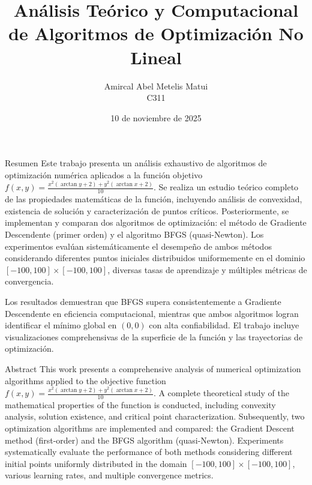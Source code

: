 \documentclass[11pt, a4paper, twocolumn]{beamer}
\author{Amircal Abel Metelis Matui \\ C311}
\title{Análisis Teórico y Computacional de Algoritmos de Optimización No Lineal}
\date{10 de noviembre de 2025}
\institute{
	\inst{1}
		Universidad de La Habana\\
	\inst{2}
		Facultad de Matemática y Computación\\
}
\begin{document}
	
	\begin{frame}
		\maketitle
	\end{frame}

	\begin{frame}{Resumen}
		Este trabajo presenta un análisis exhaustivo de algoritmos de optimización numérica aplicados a la función objetivo $f(x,y) = \frac{x^2 (\arctan y + 2) + y^2 (\arctan x + 2)}{10}$. Se realiza un estudio teórico completo de las propiedades matemáticas de la función, incluyendo análisis de convexidad, existencia de solución y caracterización de puntos críticos. Posteriormente, se implementan y comparan dos algoritmos de optimización: el método de Gradiente Descendente (primer orden) y el algoritmo BFGS (quasi-Newton). Los experimentos evalúan sistemáticamente el desempeño de ambos métodos considerando diferentes puntos iniciales distribuidos uniformemente en el dominio $[-100, 100] \times [-100, 100]$, diversas tasas de aprendizaje y múltiples métricas de convergencia. 
	\end{frame}	
	\begin{frame}
		Los resultados demuestran que BFGS supera consistentemente a Gradiente Descendente en eficiencia computacional, mientras que ambos algoritmos logran identificar el mínimo global en $(0,0)$ con alta confiabilidad. El trabajo incluye visualizaciones comprehensivas de la superficie de la función y las trayectorias de optimización.
	\end{frame}
	
	\begin{frame}{Abstract}
		This work presents a comprehensive analysis of numerical optimization algorithms applied to the objective function $f(x,y) = \frac{x^2 (\arctan y + 2) + y^2 (\arctan x + 2)}{10}$. A complete theoretical study of the mathematical properties of the function is conducted, including convexity analysis, solution existence, and critical point characterization. Subsequently, two optimization algorithms are implemented and compared: the Gradient Descent method (first-order) and the BFGS algorithm (quasi-Newton). Experiments systematically evaluate the performance of both methods considering different initial points uniformly distributed in the domain $[-100, 100] \times [-100, 100]$, various learning rates, and multiple convergence metrics.
	\end{frame}
	
\end{document}
